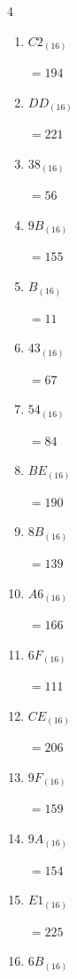 \begin{multicols}{4}
\begin{enumerate}
        $=191$

  \item $C2_{(16)}$

        $=194$

  \item $DD_{(16)}$

        $=221$

  \item $38_{(16)}$

        $=56$

  \item $9B_{(16)}$

        $=155$

  \item $B_{(16)}$

        $=11$

  \item $43_{(16)}$

        $=67$

  \item $54_{(16)}$

        $=84$

  \item $BE_{(16)}$

        $=190$

  \item $8B_{(16)}$

        $=139$

  \item $A6_{(16)}$

        $=166$

  \item $6F_{(16)}$

        $=111$

  \item $CE_{(16)}$

        $=206$

  \item $9F_{(16)}$

        $=159$

  \item $9A_{(16)}$

        $=154$

\columnbreak %

\resetques

  \item $E1_{(16)}$

        $=225$

  \item $6B_{(16)}$


\end{enumerate}
\end{multicols}
